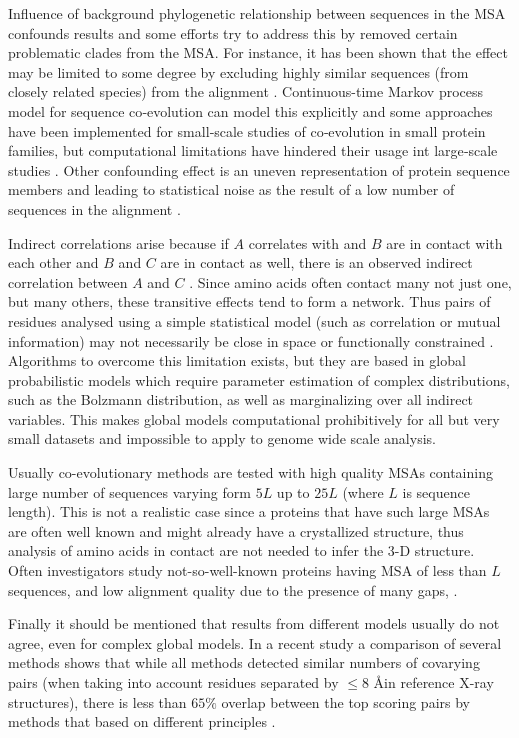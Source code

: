 Influence of background phylogenetic relationship between sequences in the MSA confounds results and some efforts try to address this by 
removed certain problematic clades from the MSA.
For instance, it has been shown that the effect may be limited to some degree by excluding highly similar sequences (from closely related species) from the alignment \cite{wollenberg2000separation}.
Continuous-time Markov process model for sequence co‐evolution can model this explicitly and some approaches have been implemented for small‐scale studies of co‐evolution in small protein families, but computational limitations have hindered their usage int large‐scale studies \cite{de2013emerging}.
Other confounding effect is an uneven representation of protein sequence members and leading to statistical noise as the result of a low number of sequences in the alignment \cite{marks2012protein}.

Indirect correlations arise because 	if $A$ correlates with and $B$ are in contact with each other and $B$ and $C$ are in contact as well, there is an observed indirect correlation between $A$ and $C$ \cite{marks2012protein}.
Since amino acids often contact many not just one, but many others, these transitive effects tend to form a network.
Thus pairs of residues analysed using a simple statistical model (such as correlation or mutual information) may not necessarily be close in space or functionally constrained \cite{marks2012protein}.
Algorithms to overcome this limitation exists, but they are based in global probabilistic models which require parameter estimation of complex distributions, such as the Bolzmann distribution, as well as marginalizing over all indirect variables.
This makes global models computational prohibitively for all but very small datasets and impossible to apply to genome wide scale analysis.

Usually co-evolutionary methods are tested with high quality MSAs containing large number of sequences varying form $5L$ up to $25L$ (where $L$ is  sequence length).
This is not a realistic case since a proteins that have such large MSAs are often well known and might already have a crystallized structure, thus analysis of amino acids in contact are not needed to infer the 3-D structure.
Often investigators study not-so-well-known proteins having MSA of less than $L$ sequences, and low alignment quality due to the presence of many gaps, \cite{clark2014multidimensional}.

Finally it should be mentioned that results from different models usually do not agree, even for complex global models.
In a recent study a comparison of several methods shows that while all methods detected similar numbers of covarying pairs (when taking into account residues separated by $\le 8$ \AA in reference X-ray structures), there is less than $65\%$ overlap between the top scoring pairs by methods that based on different principles \cite{clark2014multidimensional}.
